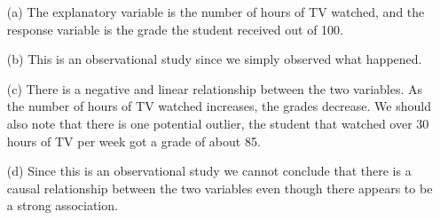 {
\begin{enumerate}
\item[(a)] The explanatory variable is the number of hours of TV watched, and the response variable is the grade the student received out of 100.
\item[(b)] This is an observational study since we simply observed what happened.
\item[(c)] There is a negative and linear relationship between the two variables. As the number of hours of TV watched increases, the grades decrease. We should also note that there is one potential outlier, the student that watched over 30 hours of TV per week got a grade of about 85. 
\item[(d)] Since this is an observational study we cannot conclude that there is a causal relationship between the two variables even though there appears to be a strong association.
\end{enumerate}
}

%

